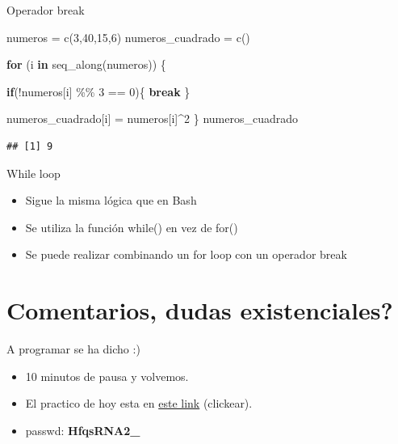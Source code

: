 \documentclass[
  ignorenonframetext,
]{beamer}
\newenvironment{Shaded}{\begin{snugshade}}{\end{snugshade}}
\newcommand{\ControlFlowTok}[1]{\textcolor[rgb]{0.13,0.29,0.53}{\textbf{#1}}}
\newcommand{\DecValTok}[1]{\textcolor[rgb]{0.00,0.00,0.81}{#1}}
\newcommand{\FunctionTok}[1]{\textcolor[rgb]{0.00,0.00,0.00}{#1}}
\newcommand{\NormalTok}[1]{#1}
\newcommand{\OtherTok}[1]{\textcolor[rgb]{0.56,0.35,0.01}{#1}}
\newcommand{\SpecialCharTok}[1]{\textcolor[rgb]{0.00,0.00,0.00}{#1}}
\providecommand{\tightlist}{%
  \setlength{\itemsep}{0pt}\setlength{\parskip}{0pt}}
\begin{document}
\begin{frame}[fragile]{Operador break}
\protect\hypertarget{operador-break}{}
\begin{Shaded}
\begin{Highlighting}[]
\NormalTok{numeros }\OtherTok{=} \FunctionTok{c}\NormalTok{(}\DecValTok{3}\NormalTok{,}\DecValTok{40}\NormalTok{,}\DecValTok{15}\NormalTok{,}\DecValTok{6}\NormalTok{)}
\NormalTok{numeros\_cuadrado }\OtherTok{=} \FunctionTok{c}\NormalTok{()}

\ControlFlowTok{for}\NormalTok{ (i }\ControlFlowTok{in} \FunctionTok{seq\_along}\NormalTok{(numeros)) \{}
  
  \ControlFlowTok{if}\NormalTok{(}\SpecialCharTok{!}\NormalTok{numeros[i] }\SpecialCharTok{\%\%} \DecValTok{3} \SpecialCharTok{==} \DecValTok{0}\NormalTok{)\{}
    \ControlFlowTok{break}
\NormalTok{  \}}
  
\NormalTok{  numeros\_cuadrado[i] }\OtherTok{=}\NormalTok{ numeros[i]}\SpecialCharTok{\^{}}\DecValTok{2}
\NormalTok{\}}
\NormalTok{numeros\_cuadrado}
\end{Highlighting}
\end{Shaded}

\begin{verbatim}
## [1] 9
\end{verbatim}
\end{frame}

\begin{frame}{While loop}
\protect\hypertarget{while-loop}{}
\begin{itemize}
\tightlist
\item
  Sigue la misma lógica que en Bash
\item
  Se utiliza la función while() en vez de for()
\item
  Se puede realizar combinando un for loop con un operador break
\end{itemize}
\end{frame}

\hypertarget{comentarios-dudas-existenciales}{%
\section{Comentarios, dudas
existenciales?}\label{comentarios-dudas-existenciales}}

\begin{frame}{A programar se ha dicho :)}
\protect\hypertarget{a-programar-se-ha-dicho}{}
\begin{itemize}
\tightlist
\item
  10 minutos de pausa y volvemos.
\item
  El practico de hoy esta en
  \href{http://www.higiene.edu.uy/ddbp/lbc/html/Practico9.html}{este
  link} (clickear).
\item
  passwd: \textbf{HfqsRNA2\_}
\end{itemize}
\end{frame}
\end{document}
